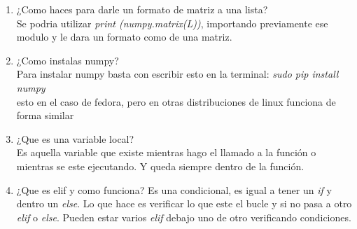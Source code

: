 \documentclass[letterpaper, 12pt, oneside]{article}%
\begin{document}
\begin{enumerate}%
	\item ¿Como haces para darle un formato de matriz a una lista? \\
	 Se podria utilizar \textit{print (numpy.matrix(L))}, importando previamente ese modulo
	 y le dara un formato como de una matriz.
	
	\item ¿Como instalas numpy?\\
	Para instalar numpy basta con escribir esto en la terminal: \textit{sudo pip install numpy}\\ esto en el caso de fedora, pero en otras distribuciones de linux funciona de forma similar
	\item ¿Que es una variable local?\\
	Es aquella variable que existe mientras hago el llamado a la función o mientras se este ejecutando. Y queda siempre dentro de la función. 
	
	\item ¿Que es elif y como funciona?
	Es una condicional, es igual a tener un \textit{if} y dentro un \textit{else}. Lo que hace es verificar lo que este el bucle y si no pasa a otro \textit{elif} o \textit{else}. Pueden estar varios \textit{elif} debajo uno de otro verificando condiciones.
	 
	
	
	
	
	
\end{enumerate}%
\end{document}
